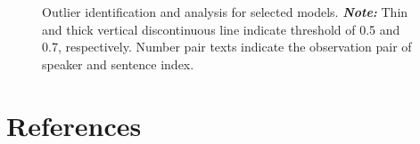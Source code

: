 \documentclass[
  authoryear,
  preprint,
  1p]{elsarticle}
\begin{document}
\label{cell-fig-rq3-model-outliers}
\begin{figure}[H]


\caption{\label{fig-rq3-model-outliers}Outlier identification and
analysis for selected models. \textbf{\emph{Note:}} Thin and thick
vertical discontinuous line indicate threshold of 0.5 and 0.7,
respectively. Number pair texts indicate the observation pair of speaker
and sentence index.}

\end{figure}%

\newpage{}

\section*{References}\label{references}

\renewcommand{\bibsection}{}

\end{document}
